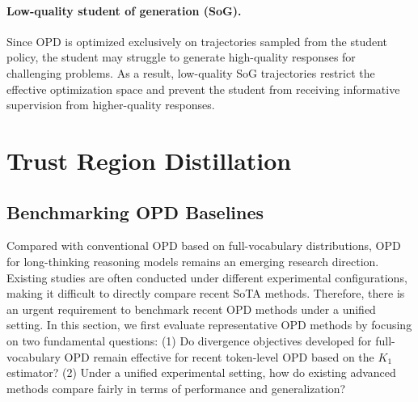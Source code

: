 \documentclass{llmxive}
\begin{document}
\paragraph{Low-quality student of generation (SoG).}
Since OPD is optimized exclusively on trajectories sampled from the student policy, the student may struggle to generate high-quality responses for challenging problems. As a result, low-quality SoG trajectories restrict the effective optimization space and prevent the student from receiving informative supervision from higher-quality responses.


\section{Trust Region Distillation}

\subsection{Benchmarking OPD Baselines}

Compared with conventional OPD based on full-vocabulary distributions, OPD for long-thinking reasoning models remains an emerging research direction. Existing studies are often conducted under different experimental configurations, making it difficult to directly compare recent SoTA methods. Therefore, there is an urgent requirement to benchmark recent OPD methods under a unified setting. In this section, we first evaluate representative OPD methods by focusing on two fundamental questions: 
(1) Do divergence objectives developed for full-vocabulary OPD remain effective for recent token-level OPD based on the $K_1$ estimator? 
(2) Under a unified experimental setting, how do existing advanced methods compare fairly in terms of performance and generalization?
\end{document}
